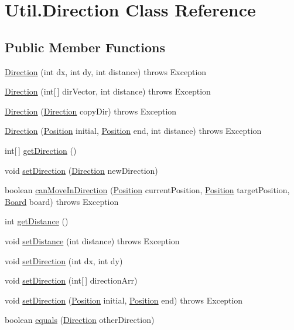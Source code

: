 \hypertarget{classUtil_1_1Direction}{\section{Util.\-Direction Class Reference}
\label{classUtil_1_1Direction}
}
\subsection*{Public Member Functions}
\begin{DoxyCompactItemize}
\item 
\hyperlink{classUtil_1_1Direction_a4d016d4fe73c7c69bc0474ca3544e229}{Direction} (int dx, int dy, int distance)  throws Exception 
\item 
\hyperlink{classUtil_1_1Direction_aca0d10a0f6f1cab6b6453442db88ac41}{Direction} (int\mbox{[}$\,$\mbox{]} dir\-Vector, int distance)  throws Exception
\item 
\hyperlink{classUtil_1_1Direction_a96dc3c7b359455ce714e2a4fb3aa9f93}{Direction} (\hyperlink{classUtil_1_1Direction}{Direction} copy\-Dir)  throws Exception
\item 
\hyperlink{classUtil_1_1Direction_ab6cd1dac79dbe582e8d671c86be71244}{Direction} (\hyperlink{classUtil_1_1Position}{Position} initial, \hyperlink{classUtil_1_1Position}{Position} end, int distance)  throws Exception
\item 
int\mbox{[}$\,$\mbox{]} \hyperlink{classUtil_1_1Direction_aec2a7a04741e2ef55d74f4635348cad3}{get\-Direction} ()
\item 
void \hyperlink{classUtil_1_1Direction_a0938e111d70b74e80faceba0f5146e17}{set\-Direction} (\hyperlink{classUtil_1_1Direction}{Direction} new\-Direction)
\item 
boolean \hyperlink{classUtil_1_1Direction_a8a6d78e18b047715a38078781b1fb813}{can\-Move\-In\-Direction} (\hyperlink{classUtil_1_1Position}{Position} current\-Position, \hyperlink{classUtil_1_1Position}{Position} target\-Position, \hyperlink{classBoard_1_1Board}{Board} board)  throws Exception
\item 
int \hyperlink{classUtil_1_1Direction_a5f52ca9bceaa59fc2afad1f87c5500ee}{get\-Distance} ()
\item 
void \hyperlink{classUtil_1_1Direction_aa5997dad71c8217853d08bd5987bfc61}{set\-Distance} (int distance)  throws Exception
\item 
void \hyperlink{classUtil_1_1Direction_aca852c23943cb0e955a5fe4aff888935}{set\-Direction} (int dx, int dy)
\item 
void \hyperlink{classUtil_1_1Direction_a0f498a800bfb0416047d0aafe12b5692}{set\-Direction} (int\mbox{[}$\,$\mbox{]} direction\-Arr)
\item 
void \hyperlink{classUtil_1_1Direction_af1244167566f6eb257798fd2d45012b5}{set\-Direction} (\hyperlink{classUtil_1_1Position}{Position} initial, \hyperlink{classUtil_1_1Position}{Position} end)  throws Exception 
\item 
boolean \hyperlink{classUtil_1_1Direction_aca147d8964ccb5618198c359998a6635}{equals} (\hyperlink{classUtil_1_1Direction}{Direction} other\-Direction)
\end{DoxyCompactItemize}


